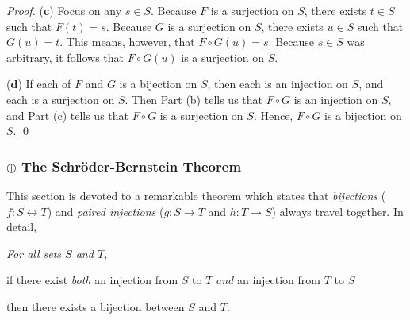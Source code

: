 \begin{proof}
\medskip

\noindent ({\bf c})
Focus on any $s \in S$.  Because $F$ is a surjection on $S$, there exists $t \in S$ such that $F(t) = s$.  Because $G$ is a surjection on $S$, there exists $u \in S$ such that $G(u) = t$.  This means, however, that $F \circ G(u) = s$.  Because $s \in S$ was arbitrary, it follows that $F \circ G(u)$ is a surjection on $S$.

\medskip

\noindent ({\bf d})
If each of $F$ and $G$ is a bijection on $S$, then each is an injection on $S$, and each is a surjection on $S$.  Then Part (b) tells us that $F \circ G$ is an injection on $S$, and Part (c) tells
us that $F \circ G$ is a surjection on $S$.  Hence, $F \circ G$ is a bijection on $S$.  \qed
\end{proof}


\subsubsection{$\oplus$ The Schr\"{o}der-Bernstein Theorem}
\label{sec:schroeder-bernstein}

This section is devoted to a remarkable theorem which states that {\em bijections} ($f: S \leftrightarrow T$) and {\em paired injections} ($g: S \rightarrow T$ and $h: T \rightarrow S$) always travel together.  In detail,

\medskip

{\em
\noindent For all sets $S$ and $T$,

\smallskip

if there exist {\em both} an injection from $S$ to $T$ {\em and} an injection from $T$ to $S$

\smallskip

then there exists a bijection between $S$ and $T$.}

\bigskip

 
 

\noindent {}

